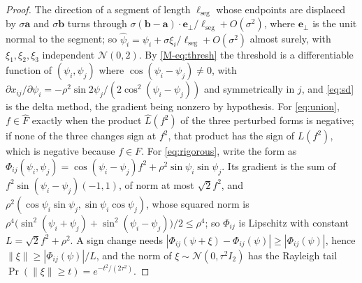 \begin{proof}
The direction of a segment of length $\ell_{\mathrm{seg}}$ whose endpoints are displaced by $\sigma\mathbf a$ and $\sigma\mathbf b$ turns through $\sigma(\mathbf b-\mathbf a)\cdot\mathbf e_{\perp}/\ell_{\mathrm{seg}}+O(\sigma^2)$, where $\mathbf e_{\perp}$ is the unit normal to the segment; so $\hat\psi_i=\psi_i+\sigma\xi_i/\ell_{\mathrm{seg}}+O(\sigma^2)$ almost surely, with $\xi_1,\xi_2,\xi_3$ independent $\mathcal N(0,2)$. By \eqref{M-eq:thresh} the threshold is a differentiable function of $(\psi_i,\psi_j)$ where $\cos(\psi_i-\psi_j)\neq0$, with $\partial x_{ij}/\partial\psi_i=-\rho^2\sin2\psi_j/(2\cos^2(\psi_i-\psi_j))$ and symmetrically in $j$, and \eqref{eq:sd} is the delta method, the gradient being nonzero by hypothesis. For \eqref{eq:union}, $f\in\hat F$ exactly when the product $\hat L(f^2)$ of the three perturbed forms is negative; if none of the three changes sign at $f^2$, that product has the sign of $L(f^2)$, which is negative because $f\in F$.
 For \eqref{eq:rigorous}, write the form as $\Phi_{ij}(\psi_i,\psi_j)=\cos(\psi_i-\psi_j)f^2+\rho^2\sin\psi_i\sin\psi_j$. Its gradient is the sum of $f^2\sin(\psi_i-\psi_j)(-1,1)$, of norm at most $\sqrt2 f^2$, and $\rho^2(\cos\psi_i\sin\psi_j,\sin\psi_i\cos\psi_j)$, whose squared norm is $\rho^4\bigl(\sin^2(\psi_i+\psi_j)+\sin^2(\psi_i-\psi_j)\bigr)/2\le\rho^4$; so $\Phi_{ij}$ is Lipschitz with constant $L=\sqrt2 f^2+\rho^2$. A sign change needs $|\Phi_{ij}(\psi+\xi)-\Phi_{ij}(\psi)|\ge|\Phi_{ij}(\psi)|$, hence $\|\xi\|\ge|\Phi_{ij}(\psi)|/L$, and the norm of $\xi\sim\mathcal N(0,\tau^2I_2)$ has the Rayleigh tail $\Pr(\|\xi\|\ge t)=e^{-t^2/(2\tau^2)}$.\end{proof}

